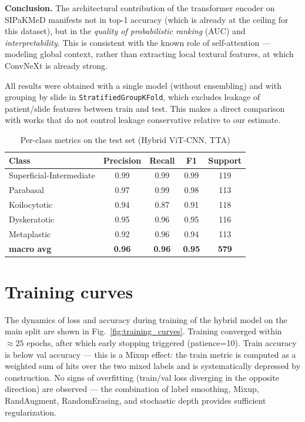 \documentclass[14pt,a4paper]{extreport}
\begin{document}
\textbf{Conclusion.} The architectural contribution of the transformer
encoder on SIPaKMeD manifests not in top-1 accuracy (which is already at
the ceiling for this dataset), but in the \textit{quality of
probabilistic ranking} (AUC) and \textit{interpretability}. This is
consistent with the known role of self-attention --- modeling global
context, rather than extracting local textural features, at which
ConvNeXt is already strong.

All results were obtained with a single model (without ensembling) and
with grouping by slide in \texttt{StratifiedGroupKFold}, which excludes
leakage of patient/slide features between train and test. This makes a
direct comparison with works that do not control leakage conservative
relative to our estimate.

\begin{table}[H]
\centering
\caption{Per-class metrics on the test set (Hybrid ViT-CNN, TTA)}
\label{tab:per_class}
\begin{tabular}{lcccc}
\toprule
Class & Precision & Recall & F1 & Support \\
\midrule
Superficial-Intermediate & 0.99 & 0.99 & 0.99 & 119 \\
Parabasal                & 0.97 & 0.99 & 0.98 & 113 \\
Koilocytotic             & 0.94 & 0.87 & 0.91 & 118 \\
Dyskeratotic             & 0.95 & 0.96 & 0.95 & 116 \\
Metaplastic              & 0.92 & 0.96 & 0.94 & 113 \\
\midrule
\textbf{macro avg}       & \textbf{0.96} & \textbf{0.96} & \textbf{0.95} & \textbf{579} \\
\bottomrule
\end{tabular}
\end{table}

\section{Training curves}

The dynamics of loss and accuracy during training of the hybrid model on
the main split are shown in Fig.~\ref{fig:training_curves}. Training
converged within $\approx 25$ epochs, after which early stopping
triggered (patience=10). Train accuracy is below val accuracy --- this
is a Mixup effect: the train metric is computed as a weighted sum of
hits over the two mixed labels and is systematically depressed by
construction. No signs of overfitting (train/val loss diverging in the
opposite direction) are observed --- the combination of label smoothing,
Mixup, RandAugment, RandomErasing, and stochastic depth provides
sufficient regularization.
\end{document}
